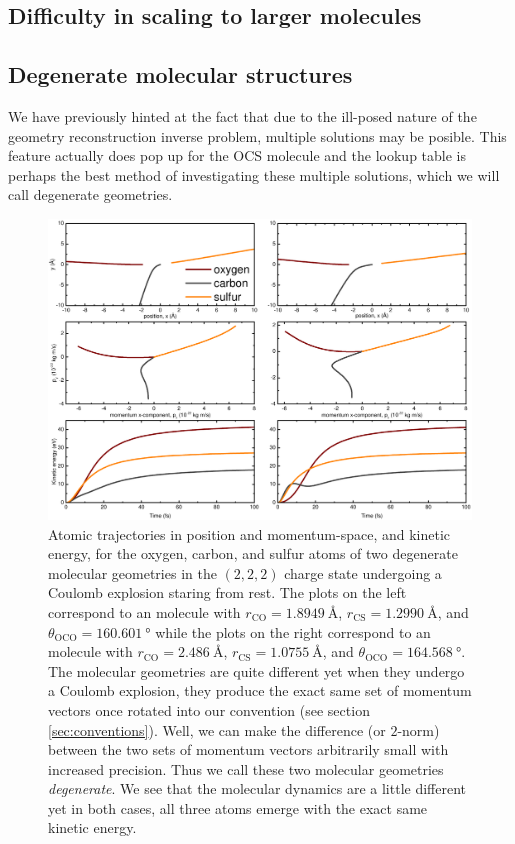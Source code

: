 \subsection{Difficulty in scaling to larger molecules}

\pagebreak
\subsection{Degenerate molecular structures}
We have previously hinted at the fact that due to the ill-posed nature of the geometry reconstruction inverse problem, multiple solutions may be posible. This feature actually does pop up for the OCS molecule and the lookup table is perhaps the best method of investigating these multiple solutions, which we will call degenerate geometries.

\begin{figure}
  \centering
  \includegraphics[width=\textwidth]{Plots/DegenerateGeometryTrajectories.pdf}
  \caption[Atomic trajectories in position and momentum-space, and kinetic energy, of two degenerate molecular geometries undergoing a Coulomb explosion.]
  {Atomic trajectories in position and momentum-space, and kinetic energy, for the oxygen, carbon, and sulfur atoms of two degenerate  molecular geometries in the $(2,2,2)$ charge state undergoing a Coulomb explosion staring from rest. The plots on the left correspond to an  molecule with $r_\textrm{CO} = \SI{1.8949}{\angstrom}$, $r_\textrm{CS} = \SI{1.2990}{\angstrom}$, and $\theta_\mathrm{OCO} = \SI{160.601}{\degree}$ while the plots on the right correspond to an  molecule with $r_\textrm{CO} = \SI{2.486}{\angstrom}$, $r_\textrm{CS} = \SI{1.0755}{\angstrom}$, and $\theta_\mathrm{OCO} = \SI{164.568}{\degree}$. The molecular geometries are quite different yet when they undergo a Coulomb explosion, they produce the exact same set of momentum vectors once rotated into our convention (see section \ref{sec:conventions}). Well, we can make the difference (or $2$-norm) between the two sets of momentum vectors arbitrarily small with increased precision. Thus we call these two molecular geometries \emph{degenerate}. We see that the molecular dynamics are a little different yet in both cases, all three atoms emerge with the exact same kinetic energy.}
  \label{fig:DegenerateGeometryTrajectories}
\end{figure}
\clearpage

